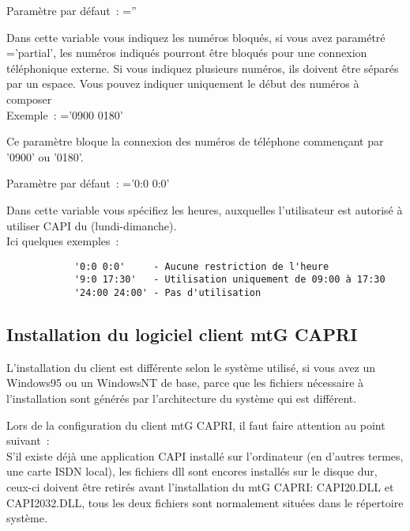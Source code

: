 \begin{description}

        Paramètre par défaut~: =''

        Dans cette variable vous indiquez les numéros bloqués, si vous avez paramétré
		='partial', les numéros indiqués pourront
		être bloqués pour une connexion téléphonique externe.
		Si vous indiquez plusieurs numéros, ils doivent être séparés par un espace.
		Vous pouvez indiquer uniquement le début des numéros à composer \\
		Exemple~: ='0900 0180'

		Ce paramètre bloque la connexion des numéros de téléphone commençant par '0900' ou '0180'.


        Paramètre par défaut~: ='0:0 0:0'

        Dans cette variable vous spécifiez les heures, auxquelles l'utilisateur est autorisé
		à utiliser CAPI du (lundi-dimanche). \\ 
		Ici quelques exemples~:
        \begin{verbatim}
            '0:0 0:0'     - Aucune restriction de l'heure
            '9:0 17:30'   - Utilisation uniquement de 09:00 à 17:30
            '24:00 24:00' - Pas d'utilisation
        \end{verbatim}


\end{description}

\subsection{Installation du logiciel client mtG CAPRI}
    
	L'installation du client est différente selon le système utilisé, si vous avez un Windows95
	ou un WindowsNT de base, parce que les fichiers nécessaire à l'installation sont générés par
	l'architecture du système qui est différent.

    Lors de la configuration du client mtG CAPRI, il faut faire attention au point suivant~: \\
	S'il existe déjà une application CAPI installé sur l'ordinateur (en d'autres termes, une carte
	ISDN local), les fichiers dll sont encores installés sur le disque dur, ceux-ci doivent être
	retirés avant l'installation du mtG CAPRI: CAPI20.DLL et CAPI2032.DLL, tous les deux fichiers sont
	normalement situées dans le répertoire système. \\

